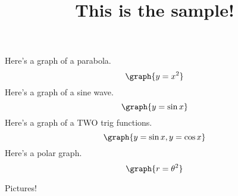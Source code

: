 \documentclass{ximera}
\title{This is the sample!}
\begin{document}
\maketitle

\mypreamble


Here's a graph of a parabola.
\[
\graph{y=x^2}
\]
Here's a graph of a sine wave.
\[
\graph{y=\sin x}
\]
Here's a graph of a TWO trig functions.
\[
\graph{y=\sin x, y=\cos x}
\]
Here's a polar graph.
\[
\graph{r=\theta^2}
\]

Pictures!







  
    
      
\end{document}
